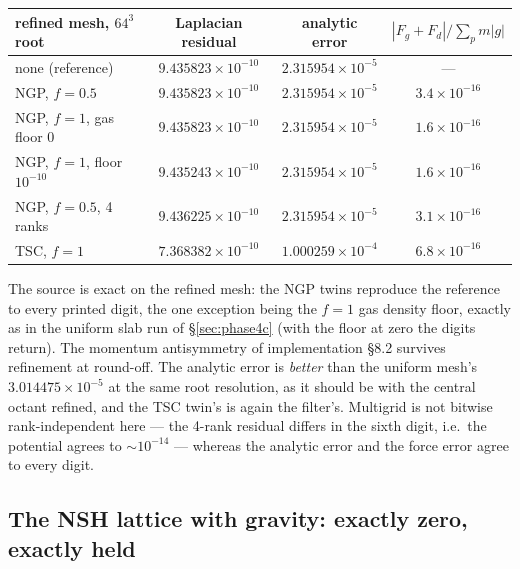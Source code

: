 \documentclass[11pt]{article}
\begin{document}
\begin{center}
\small
\begin{tabular}{@{}lccc@{}}
\toprule
refined mesh, $64^3$ root & Laplacian residual & analytic error & $|F_g + F_d|/\sum_p m|g|$ \\
\midrule
none (reference)              & $9.435823\times10^{-10}$ & $2.315954\times10^{-5}$ & --- \\
NGP, $f = 0.5$                & $9.435823\times10^{-10}$ & $2.315954\times10^{-5}$ & $3.4\times10^{-16}$ \\
NGP, $f = 1$, gas floor $0$   & $9.435823\times10^{-10}$ & $2.315954\times10^{-5}$ & $1.6\times10^{-16}$ \\
NGP, $f = 1$, floor $10^{-10}$& $9.435243\times10^{-10}$ & $2.315954\times10^{-5}$ & $1.6\times10^{-16}$ \\
NGP, $f = 0.5$, 4 ranks       & $9.436225\times10^{-10}$ & $2.315954\times10^{-5}$ & $3.1\times10^{-16}$ \\
TSC, $f = 1$                  & $7.368382\times10^{-10}$ & $1.000259\times10^{-4}$ & $6.8\times10^{-16}$ \\
\bottomrule
\end{tabular}
\end{center}

The source is exact on the refined mesh: the NGP twins reproduce the reference to every
printed digit, the one exception being the $f = 1$ gas density floor, exactly as in the
uniform slab run of \S\ref{sec:phase4c} (with the floor at zero the digits return). The
momentum antisymmetry of implementation \S8.2 survives refinement at round-off. The
analytic error is \emph{better} than the uniform mesh's $3.014475\times10^{-5}$ at the
same root resolution, as it should be with the central octant refined, and the TSC twin's
is again the filter's. Multigrid is not bitwise rank-independent here --- the 4-rank
residual differs in the sixth digit, i.e.\ the potential agrees to $\sim10^{-14}$ ---
whereas the analytic error and the force error agree to every digit.

\subsection{The NSH lattice with gravity: exactly zero, exactly held}
\label{sec:gravsmr-nsh}
\end{document}
